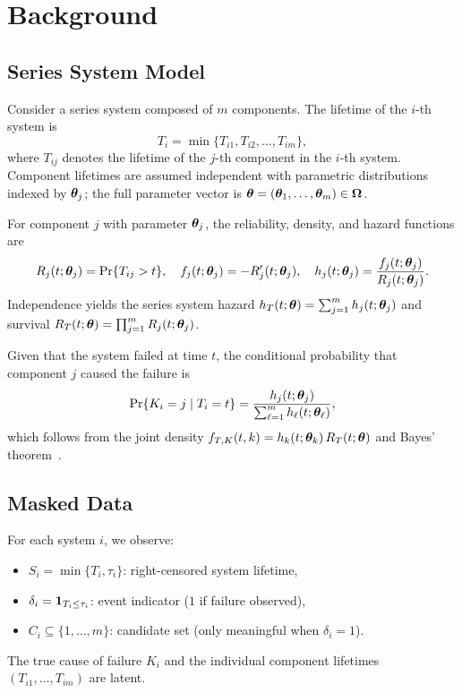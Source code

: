 \section{Background}
\label{sec:background}

\subsection{Series System Model}
\label{sec:series-model}

Consider a series system composed of $m$ components. The lifetime of the
$i$-th system is
\begin{equation}
    T_i = \min\{T_{i1}, T_{i2}, \ldots, T_{im}\},
\end{equation}
where $T_{ij}$ denotes the lifetime of the $j$-th component in the $i$-th
system. Component lifetimes are assumed independent with parametric
distributions indexed by $\bm{\theta}_j$; the full parameter vector is
$\bm{\theta} = (\bm{\theta}_1, \ldots, \bm{\theta}_m) \in \bm{\Omega}$.

For component $j$ with parameter $\bm{\theta}_j$, the reliability, density, and
hazard functions are
\begin{equation}
    R_j(t; \bm{\theta}_j) = \mathrm{Pr}\{T_{ij} > t\}, \quad
    f_j(t; \bm{\theta}_j) = -R_j'(t; \bm{\theta}_j), \quad
    h_j(t; \bm{\theta}_j) = \frac{f_j(t; \bm{\theta}_j)}{R_j(t; \bm{\theta}_j)}.
\end{equation}
Independence yields the series system hazard
$h_T(t; \bm{\theta}) = \sum_{j=1}^m h_j(t; \bm{\theta}_j)$ and survival
$R_T(t; \bm{\theta}) = \prod_{j=1}^m R_j(t; \bm{\theta}_j)$.

Given that the system failed at time $t$, the conditional probability that
component $j$ caused the failure is
\begin{equation}
\label{eq:cond-failure}
    \Prob\{K_i = j \mid T_i = t\} = \frac{h_j(t; \vtheta_j)}{%
    \sum_{\ell=1}^m h_\ell(t; \vtheta_\ell)},
\end{equation}
which follows from the joint density $f_{T,K}(t,k) = h_k(t;\bm{\theta}_k)\,
R_T(t;\bm{\theta})$ and Bayes' theorem~\citep{towell2023reliability}.

\subsection{Masked Data}
\label{sec:masked-data}

For each system $i$, we observe:
\begin{itemize}
    \item $S_i = \min\{T_i, \tau_i\}$: right-censored system lifetime,
    \item $\delta_i = \mathbf{1}_{T_i \leq \tau_i}$: event indicator
        ($1$ if failure observed),
    \item $C_i \subseteq \{1, \ldots, m\}$: candidate set
        (only meaningful when $\delta_i = 1$).
\end{itemize}
The true cause of failure $K_i$ and the individual component lifetimes
$(T_{i1}, \ldots, T_{im})$ are latent.

